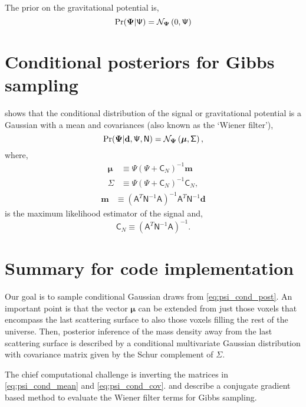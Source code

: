 \documentclass[11pt, letterpaper]{article}
\newcommand{\mv}{\mathbf{m}}
\newcommand{\muv}{\bm \mu}
\newcommand{\data}{\mathbf{d}}
\newcommand{\transfer}{\mathsf{A}}
\newcommand{\Nmat}{\mathsf{N}}
\newcommand{\Psimat}{\mathsf{\Psi}}
\newcommand{\Sigmamat}{\mathsf{\Sigma}}
\newcommand{\Cmat}{\mathsf{C}}
\newcommand{\gravpot}{\bm \Psi}
\newcommand{\normdist}{\mathcal{N}}
\def\pr{{\rm Pr}}
\begin{document}
The prior on the gravitational potential is,
\begin{equation}
	\pr(\gravpot | \Psimat) = 
	\normdist_{\gravpot} \left(0, \Psimat\right)
\end{equation}

\section{Conditional posteriors for Gibbs sampling}
\citet{Wandelt:2003uk} shows that the conditional distribution 
of the signal or gravitational potential is a Gaussian with a 
mean and covariances (also known as the `Wiener filter'),
\begin{equation}\label{eq:psi_cond_post}
	\pr(\gravpot | \data, \Psimat, \Nmat) 
	= \normdist_{\gravpot}
	\left(\muv, \Sigmamat\right),
\end{equation}
where,
\begin{align}
	\muv &\equiv \Psimat 
	\left(\Psimat + \Cmat_{N}\right)^{-1}\mv
	\label{eq:psi_cond_mean}
	\\
	\Sigmamat &\equiv 
	\Psimat 
	\left(\Psimat + \Cmat_{N}\right)^{-1} \Cmat_{N},
	\label{eq:psi_cond_cov}
\end{align}
\begin{align}
	\mv &\equiv	
	\left(\transfer^{T} \Nmat^{-1}\transfer\right)^{-1}
	\transfer^{T}\Nmat^{-1} \data 
\end{align}
is the maximum likelihood estimator of the signal and,
\begin{equation}
	\Cmat_{N} \equiv \left(\transfer^{T} \Nmat^{-1}\transfer\right)^{-1}.
\end{equation}

\section{Summary for code implementation}
Our goal is to sample conditional Gaussian draws from \autoref{eq:psi_cond_post}. 
An important point is that the vector $\muv$ can be extended from just those 
voxels that encompass the last scattering surface to also those voxels 
filling the rest of the universe. Then, posterior inference of the mass density 
away from the last scattering surface is described by a conditional 
multivariate Gaussian distribution with covariance matrix given by the 
Schur complement of $\Sigmamat$.

The chief computational challenge is inverting the matrices in 
\autoref{eq:psi_cond_mean} and \autoref{eq:psi_cond_cov}.
\citet{Wandelt:2003uk} and \citet{Wandelt:2004ul} describe 
a conjugate gradient based method to evaluate the Wiener filter terms for 
Gibbs sampling. 
\end{document}
